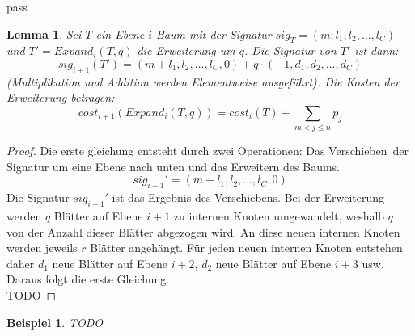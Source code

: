 pass\documentclass[a4paper,10pt,ngerman]{scrartcl}
\newtheorem{lemma}[satz]{Lemma}
\newtheorem{beispiel}[satz]{Beispiel}
\begin{document}
    \begin{lemma}
        Sei $T$ ein Ebene-$i$-Baum mit der Signatur $sig_T = (m;l_1,l_2,\dots,l_C)$ und $T' = Expand_i(T,q)$ die Erweiterung um $q$. Die Signatur von $T'$ ist dann: \[sig_{i+1}(T') = (m + l_1, l_2, \dots, l_C, 0) + q \cdot (-1, d_1, d_2, \dots, d_C)\]
        (Multiplikation und Addition werden Elementweise ausgeführt). Die Kosten der Erweiterung betragen:
        \[cost_{i+1}(Expand_i(T,q)) = cost_i(T) + \sum_{m < j \le n}p_j\]
    \end{lemma}
    \begin{proof}
        Die erste gleichung entsteht durch zwei Operationen: Das \glqq Verschieben\grqq\ der Signatur um eine Ebene nach unten und das Erweitern des Baums.
        \[sig_{i+1}' = (m + l_1, l_2, \dots, l_C, 0)\]
        Die Signatur $sig_{i+1}'$ ist das Ergebnis des Verschiebens.
        Bei der Erweiterung werden $q$ Blätter auf Ebene $i + 1$ zu internen Knoten umgewandelt, weshalb $q$ von der Anzahl dieser Blätter abgezogen wird.
        An diese neuen internen Knoten werden jeweils $r$ Blätter angehängt.
        Für jeden neuen internen Knoten entstehen daher $d_1$ neue Blätter auf Ebene $i+2$, $d_2$ neue Blätter auf Ebene $i+3$ usw.
        Daraus folgt die erste Gleichung. \\
        TODO

    \end{proof}
    \begin{beispiel}
        TODO
    \end{beispiel}
\end{document}
